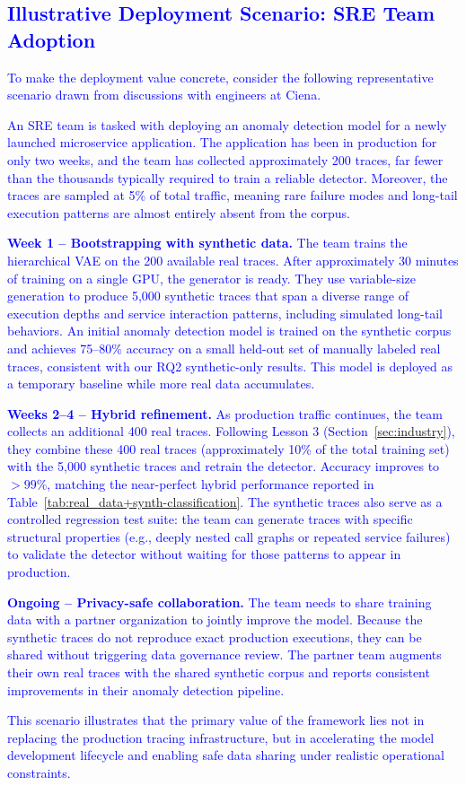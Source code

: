 \documentclass[sigconf,review]{acmart}
\begin{document}
\textcolor{blue}{\subsection{Illustrative Deployment Scenario: SRE Team Adoption}
\label{sec:sre_scenario}

To make the deployment value concrete, consider the following representative scenario drawn from discussions with engineers at Ciena.

An SRE team is tasked with deploying an anomaly detection model for a newly launched microservice application. The application has been in production for only two weeks, and the team has collected approximately 200 traces, far fewer than the thousands typically required to train a reliable detector. Moreover, the traces are sampled at 5\% of total traffic, meaning rare failure modes and long-tail execution patterns are almost entirely absent from the corpus.

\textbf{Week 1 -- Bootstrapping with synthetic data.} The team trains the hierarchical VAE on the 200 available real traces. After approximately 30 minutes of training on a single GPU, the generator is ready. They use variable-size generation to produce 5,000 synthetic traces that span a diverse range of execution depths and service interaction patterns, including simulated long-tail behaviors. An initial anomaly detection model is trained on the synthetic corpus and achieves 75--80\% accuracy on a small held-out set of manually labeled real traces, consistent with our RQ2 synthetic-only results. This model is deployed as a temporary baseline while more real data accumulates.

\textbf{Weeks 2--4 -- Hybrid refinement.} As production traffic continues, the team collects an additional 400 real traces. Following Lesson 3 (Section~\ref{sec:industry}), they combine these 400 real traces (approximately 10\% of the total training set) with the 5,000 synthetic traces and retrain the detector. Accuracy improves to $>99\%$, matching the near-perfect hybrid performance reported in Table~\ref{tab:real_data+synth-classification}. The synthetic traces also serve as a controlled regression test suite: the team can generate traces with specific structural properties (e.g., deeply nested call graphs or repeated service failures) to validate the detector without waiting for those patterns to appear in production.

\textbf{Ongoing -- Privacy-safe collaboration.} The team needs to share training data with a partner organization to jointly improve the model. Because the synthetic traces do not reproduce exact production executions, they can be shared without triggering data governance review. The partner team augments their own real traces with the shared synthetic corpus and reports consistent improvements in their anomaly detection pipeline.

This scenario illustrates that the primary value of the framework lies not in replacing the production tracing infrastructure, but in accelerating the model development lifecycle and enabling safe data sharing under realistic operational constraints.}
\end{document}
